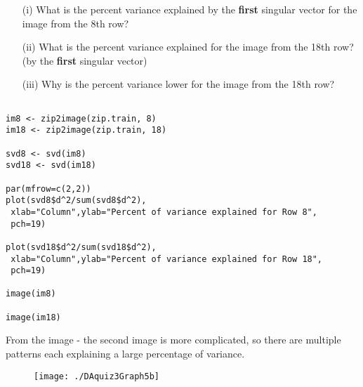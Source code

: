 \documentclass[12pt]{article}
\begin{document}
\begin{itemize}
\item[(i)] What is the percent variance explained by the \textbf{first} singular vector for the image
from the 8th row? 
\item[(ii)] What is the percent variance explained for the image from the
18th row? (by the \textbf{first} singular vector)
\item[(iii)] Why is the percent variance lower for the image from the 18th row?
\end{itemize}
\newpage
\begin{framed}
\begin{verbatim}

im8 <- zip2image(zip.train, 8)
im18 <- zip2image(zip.train, 18)

svd8 <- svd(im8)
svd18 <- svd(im18)

par(mfrow=c(2,2))
plot(svd8$d^2/sum(svd8$d^2),
 xlab="Column",ylab="Percent of variance explained for Row 8",
 pch=19)

plot(svd18$d^2/sum(svd18$d^2),
 xlab="Column",ylab="Percent of variance explained for Row 18",
 pch=19)

image(im8)

image(im18)

\end{verbatim}
\end{framed}
\newpage
From the image - the second image is more complicated, so there are multiple patterns each explaining a large percentage of variance.
\begin{figure}[h!]
\centering
\texttt{[image: ./DAquiz3Graph5b]}
\caption{}
\label{fig:DAquiz3Graph5}
\end{figure}
\end{document}
